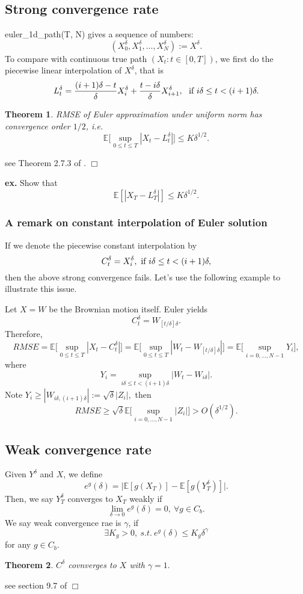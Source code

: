 \documentclass{article}
\newtheorem{theorem}{Theorem}
\newenvironment{proof}{\noindent {\sc Proof:}}{$\Box$} %
\begin{document}
\subsection{Strong convergence rate}

euler\_1d\_path(T, N) gives a sequence of numbers:
$$(X_{0}^{\delta}, X_{1}^{\delta}, \ldots, X_{N}^{\delta}) := X^{\delta}.$$
To compare with continuous true path $(X_{t}: t\in [0,T])$, we first do the piecewise linear interpolation of $X^{\delta}$, that is
$$L^{\delta}_{t} = \frac{(i+1)\delta - t}{\delta} X_{i}^{\delta} 
+ \frac{t - i\delta}{\delta} X_{i+1}^{\delta}, \ \hbox{ if } 
i\delta \le t < (i+1)\delta.$$

\begin{theorem}
 RMSE of Euler approximation 
 under uniform norm has convergence order $1/2$, i.e.
 $$\mathbb E \Big [\sup_{0 \le t\le T} |X_{t} - L_{t}^{\delta}| \Big] \le K \delta^{1/2}.$$
\end{theorem}
\begin{proof}
 see Theorem 2.7.3 of \cite{Mao07}.
\end{proof}

{\bf ex.} Show that 
$$\mathbb E [ |X_{T} - L_{T}^{\delta} | ] \le K \delta^{1/2}.$$

\subsubsection{A remark on constant interpolation of Euler solution}
If we denote the piecewise constant interpolation by
$$C_{t}^{\delta} = 
X_{i}^{\delta}, \hbox{ if } i\delta \le t < (i+1) \delta, $$
then the above strong convergence fails. Let's use the following example to illustrate this issue.

Let $X = W$ be the Brownian motion itself.
Euler yields
$$C_{t}^{\delta} = W_{[t/\delta] \delta}.$$
Therefore, 
$$RMSE = 
\mathbb E  \Big [\sup_{0 \le t\le T} |X_{t} - C_{t}^{\delta}| \Big] 
= \mathbb E  \Big [\sup_{0 \le t\le T} |W_{t} - W_{[t/\delta]\delta}| \Big] 
=  \mathbb E  \Big [\sup_{i = 0, \ldots, N-1} Y_{i} \Big],
$$
where 
$$Y_{i} = \sup_{i\delta \le t < (i+1) \delta} |W_{t} - W_{i\delta}|.$$
Note $Y_{i} \ge |W_{i\delta, (i+1)\delta}| := \sqrt \delta |Z_{i}|,$ then 
$$RMSE \ge  \sqrt \delta  \mathbb E  
\Big [\sup_{i = 0, \ldots, N-1} |Z_{i}| \Big ]
> O(\delta^{1/2}).$$

\subsection{Weak convergence rate}
Given $Y^{\delta}$ and $X$, we define
$$e^{g} (\delta) = \Big| \mathbb E[ g(X_{T})] - 
\mathbb E[g (Y^{\delta}_{T})] \Big|.$$
Then, we say $Y^{\delta}_{T} $ converges to $X_{T}$ weakly if
$$\lim_{\delta\to 0} e^{g} (\delta) = 0, \ \forall g \in C_{b}.$$
We say weak convergence rae is $\gamma$, if
$$\exists K_{g} >0, \ s.t. \ e^{g}(\delta) \le K_{g} \delta^{\gamma}$$
for any $g\in C_{b}$.

\begin{theorem}
 $C^{\delta}$ covnverges to $X$ with $\gamma = 1.$
\end{theorem}
\begin{proof}
 see section 9.7 of  \cite{KP92}
\end{proof}


%
%

\end{document}
